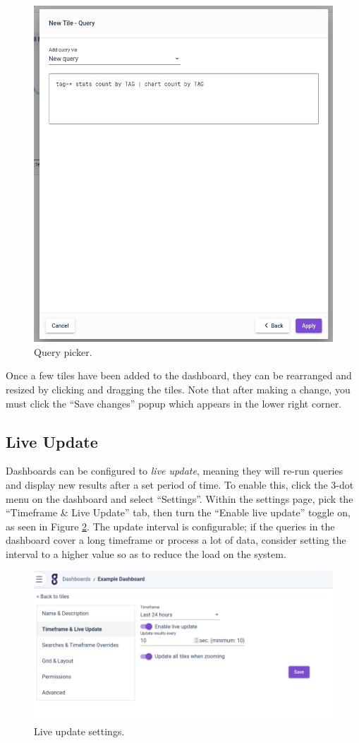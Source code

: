 \begin{figure}
	\includegraphics[width=0.6\linewidth]{images/query-settings.png}
	\caption{Query picker.}
	\label{fig:query-settings}
\end{figure}

Once a few tiles have been added to the dashboard, they can be rearranged and resized by clicking and dragging the tiles. Note that after making a change, you must click the ``Save changes'' popup which appears in the lower right corner.

\subsection{Live Update}
Dashboards can be configured to \emph{live update}, meaning they will re-run queries and display new results after a set period of time. To enable this, click the 3-dot menu on the dashboard and select ``Settings''. Within the settings page, pick the ``Timeframe \& Live Update'' tab, then turn the ``Enable live update'' toggle on, as seen in Figure \ref{fig:live-update}. The update interval is configurable; if the queries in the dashboard cover a long timeframe or process a lot of data, consider setting the interval to a higher value so as to reduce the load on the system.

\begin{figure}
	\includegraphics[width=0.7\linewidth]{images/live-update.png}
	\caption{Live update settings.}
	\label{fig:live-update}
\end{figure}

